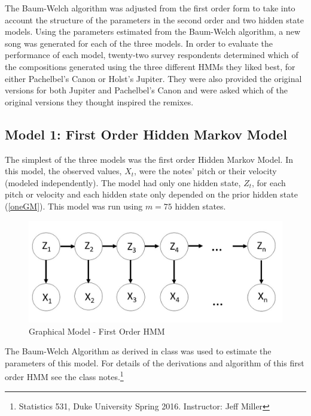 \documentclass{article} %
\begin{document}
The Baum-Welch algorithm was adjusted from the  first order form to take into account the structure of the parameters in the second order and two hidden state models.   Using the parameters estimated from the Baum-Welch algorithm, a new song was generated for each of the three models. In order to evaluate the performance of each model, twenty-two survey respondents determined which of the compositions generated using the three different HMMs they liked best, for either Pachelbel's Canon or Holst's Jupiter. They were also provided  the original versions for both Jupiter and Pachelbel's Canon and were asked which of the original versions they thought inspired the remixes. 

\subsection {Model 1: First Order Hidden Markov Model}

The simplest of the three models was the first order Hidden Markov Model. In this model, the observed values, $X_t$, were the notes' pitch or their velocity (modeled independently). The model had only one hidden state, $Z_t$, for each pitch or velocity  and each hidden state only depended on the prior hidden state (\autoref{oneGM}). This model was run using $m = 75$ hidden states.

\begin{figure}[H]
\begin{center}


\includegraphics [scale = 0.35] {Model1.jpg}

\caption{Graphical Model - First Order HMM \label{oneGM}}
\end{center}
\end{figure}

The Baum-Welch Algorithm as derived in class was used to estimate the parameters of this model. For details of the derivations and algorithm of this first order HMM see the class notes.\footnote{Statistics 531, Duke University Spring 2016. Instructor: Jeff Miller}
 
\end{document}
